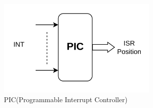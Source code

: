 \begin{figure}
    \centering
    \includegraphics[width=0.7\textwidth]{img/PIC.png}
    \caption{PIC(Programmable Interrupt Controller)}\label{img:PIC}
\end{figure}